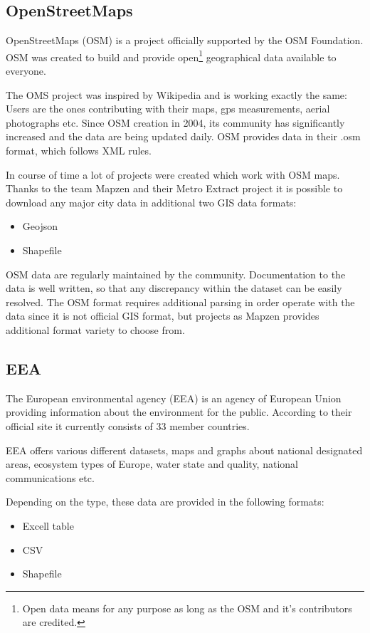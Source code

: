 \documentclass[thesis=M,english]{FITthesis}[2012/10/20]
\begin{document}
\subsection{OpenStreetMaps}
OpenStreetMaps (OSM) is a project officially supported by the OSM Foundation.
OSM was created to build and provide open\footnote{Open data means for any purpose as long as the OSM and it's contributors are credited.} geographical data available to everyone.  

The OMS project was inspired by Wikipedia and is working exactly the same: Users are the ones contributing with their maps, gps measurements, aerial photographs etc. Since OSM creation in 2004, its community has significantly increased and the data are being updated daily.
OSM provides data in their .osm format, which follows XML rules.

In course of time a lot of projects were created which work with OSM maps.
Thanks to the team Mapzen and their Metro Extract project it is possible to download any major city data in additional two GIS data formats:
\begin{itemize}
\item Geojson
\item Shapefile
\end{itemize}

OSM data are regularly maintained by the community. Documentation to the data is well written, so that any discrepancy within the dataset can be easily resolved. The OSM format requires additional parsing in order operate with the data since it is not official GIS format, but projects as Mapzen provides additional format variety to choose from.

\subsection{EEA}
The European environmental agency (EEA) is an agency of European Union providing information about the environment for the public. According to their official site \cite{EEA16} it currently consists of 33 member countries.

EEA offers various different datasets, maps and graphs about national designated areas, ecosystem types of Europe, water state and quality, national communications etc. 

Depending on the type, these data are provided in the following formats:
\begin{itemize}
\item Excell table
\item CSV
\item Shapefile
\end{itemize} 
\end{document}
